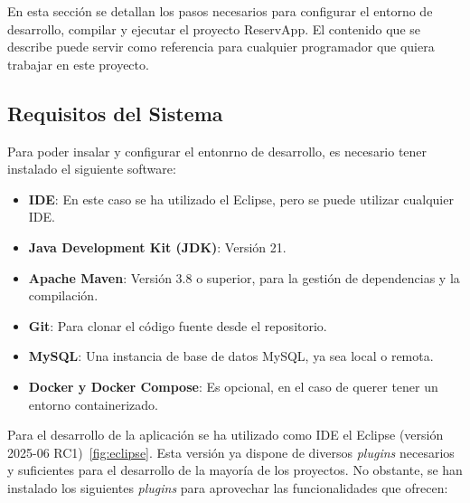 En esta sección se detallan los pasos necesarios para configurar el entorno de desarrollo, compilar y ejecutar el proyecto ReservApp. El contenido que se describe puede servir como referencia para cualquier programador que quiera trabajar en este proyecto.

\subsection{Requisitos del Sistema}
Para poder insalar y configurar el entonrno de desarrollo, es necesario tener instalado el siguiente software:
\begin{itemize}
   \item \textbf{IDE}: En este caso se ha utilizado el Eclipse, pero se puede utilizar cualquier IDE.
   \item \textbf{Java Development Kit (JDK)}: Versión 21.
   \item \textbf{Apache Maven}: Versión 3.8 o superior, para la gestión de dependencias y la compilación.
   \item \textbf{Git}: Para clonar el código fuente desde el repositorio.
   \item \textbf{MySQL}: Una instancia de base de datos MySQL, ya sea local o remota.
   \item \textbf{Docker y Docker Compose}: Es opcional, en el caso de querer tener un entorno containerizado.
\end{itemize}


Para el desarrollo de la aplicación se ha utilizado como IDE el Eclipse (versión 2025-06 RC1)~\ref{fig:eclipse}. Esta versión ya dispone de diversos \emph{plugins} necesarios y suficientes para el desarrollo de la mayoría de los proyectos. No obstante, se han instalado los siguientes \emph{plugins} para aprovechar las funcionalidades que ofrecen:


